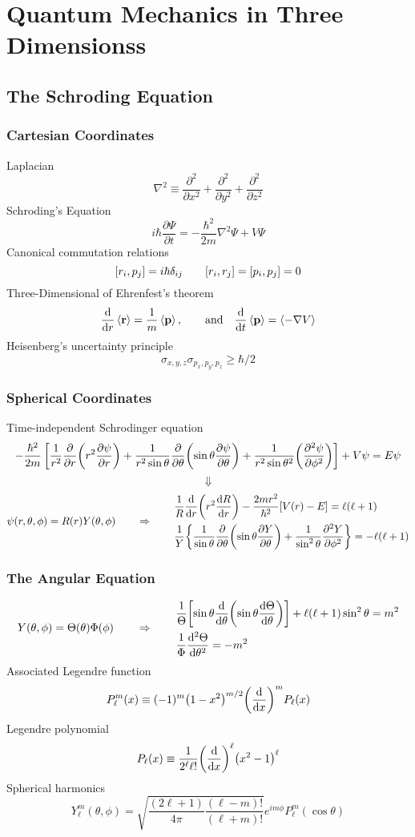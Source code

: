 \chapter{Quantum Mechanics in Three Dimensionss}

\section{The Schroding Equation}
\subsection{Cartesian Coordinates}
Laplacian\[\nabla^2\equiv\frac{\partial^2}{\partial x^2}+
\frac{\partial^2}{\partial y^2}+\frac{\partial^2}{\partial z^2}\]
Schroding's Equation
\[i\hbar\frac{\partial\Psi}{\partial t} = -\frac{\hbar^2}{2m}\nabla^2\Psi+V\Psi\]
Canonical commutation relations
\[\comm{r_i}{p_j} = i\hbar\delta_{ij} \qquad \comm{r_i}{r_j}=\comm{p_i}{p_j}=0\]
Three-Dimensional of Ehrenfest's theorem
\[\dv{r}\expval{\mathbf{r}} = \frac{1}{m}\expval{\mathbf{p}},\qquad
\text{and} \quad \dv{t}\expval{\mathbf{p}}=\expval{-\nabla V}\]
Heisenberg's uncertainty principle
\[\sigma_{x,y,z}\sigma_{p_x,p_y,p_z}\geq\hbar/2\]
\subsection{Spherical Coordinates}
Time-independent Schrodinger equation
\[-\frac{\hbar^2}{2m}\left[\frac{1}{r^2}\pdv{r}(r^2\pdv{\psi}{r})+\frac{1}{r^2\sin\theta}\pdv{\theta}(\sin\theta\pdv{\psi}{\theta})+
\frac{1}{r^2\sin\theta^2}\qty(\pdv[2]{\psi}{\phi})\right] + V\psi=E\psi \]
\[\Downarrow\]
\[\psi(r,\theta,\phi)=R(r)Y(\theta,\phi)\qquad\Rightarrow\qquad\begin{aligned}
       &\frac{1}{R}\dv{r}(r^2\dv{R}{r}) - \frac{2mr^2}{\hbar^2}[V(r) - E] = \ell(\ell+1) \\
       &\frac{1}{Y}\qty{\frac{1}{\sin\theta}\pdv{\theta}(\sin\theta\pdv{Y}{\theta})+\frac{1}{\sin^2\theta}\pdv[2]{Y}{\phi}} = -\ell(\ell+1)
\end{aligned}\]
\subsection{The Angular Equation}

\[Y(\theta,\phi) = \Theta(\theta)\Phi(\phi) \qquad\Rightarrow\qquad
 \begin{aligned}
       &\frac{1}{\Theta}\qty[\sin\theta\dv{\theta}(\sin\theta\dv{\Theta}{\theta})] + 
       \ell(\ell+1)\sin^2\theta = m^2 \\
       &\frac{1}{\Phi}\dv[2]{\Theta}{\theta} = -m^2
 \end{aligned}\]
 Associated Legendre function
\[P_\ell^m(x) \equiv (-1)^m\qty(1-x^2)^{m/2}\qty(\dv{x})^mP_\ell(x)\]
Legendre polynomial\[P_\ell(x)\equiv\frac{1}{2^\ell\ell!}\qty(\dv{x})^\ell\qty(x^2-1)^\ell\]
Spherical harmonics
$${ \boxed{   Y_\ell^m(\theta,\phi) = \sqrt{ \frac{(2\ell+1)}{4\pi}\frac{(\ell-m)!}{(\ell+m)!} } e^{im\phi}P^m_\ell(\cos\theta) }  }$$

